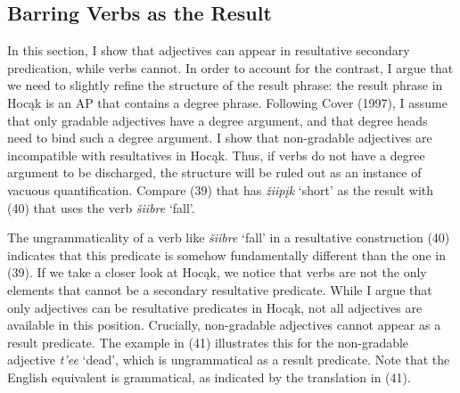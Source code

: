 \documentclass[output=paper]{LSP/langsci}
\begin{document}
\subsection{Barring Verbs as the Result}

In this section, I show that adjectives can appear in resultative secondary predication, while verbs cannot. In order to account for the contrast, I argue that we need to slightly refine the structure of the result phrase: the result phrase in Hocąk is an AP that contains a degree phrase. Following Cover (1997), I assume that only gradable adjectives have a degree argument, and that degree heads need to bind such a degree argument. I show that non-gradable adjectives are incompatible with resultatives in Hocąk. Thus, if verbs do not have a degree argument to be discharged, the structure will be ruled out as an instance of vacuous quantification. Compare (39) that has \textit{žiipįk} `short' as the result with (40) that uses the verb \textit{šiibre} `fall'.

\begin{exe}



\end{exe}

The ungrammaticality of a verb like \textit{šiibre} `fall' in a resultative construction (40) indicates that this predicate is somehow fundamentally different than the one in (39). If we take a closer look at Hocąk, we notice that verbs are not the only elements that cannot be a secondary resultative predicate. While I argue that only adjectives can be resultative predicates in Hocąk, not all adjectives are available in this position. Crucially, non-gradable adjectives cannot appear as a result predicate. The example in (41) illustrates this for the non-gradable adjective \textit{t'ee} `dead', which is ungrammatical as a result predicate. Note that the English equivalent is grammatical, as indicated by the translation in (41).
\end{document}
